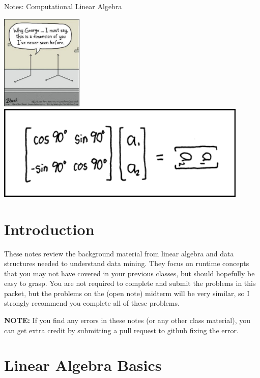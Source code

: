 \documentclass[10pt]{article}
\theoremstyle{definition}
\begin{document}
\begin{center}
{
\Huge
Notes: Computational Linear Algebra
}

\vspace{0.15in}
\end{center}

\begin{center}
\includegraphics[height=1.8in]{comic}
\includegraphics[height=1.8in]{matrix_transform}
\end{center}


\section{Introduction}

These notes review the background material from linear algebra and data structures needed to understand data mining.
They focus on runtime concepts that you may not have covered in your previous classes,
but should hopefully be easy to grasp.
You are not required to complete and submit the problems in this packet,
but the problems on the (open note) midterm will be very similar,
so I strongly recommend you complete all of these problems.

\textbf{NOTE:}
If you find any errors in these notes (or any other class material),
you can get extra credit by submitting a pull request to github fixing the error.

\section{Linear Algebra Basics}
\end{document}
